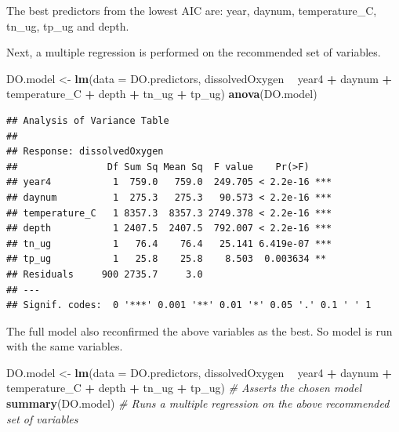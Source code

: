 \documentclass[12pt,]{article}
\newenvironment{Shaded}{\begin{snugshade}}{\end{snugshade}}
\newcommand{\CommentTok}[1]{\textcolor[rgb]{0.56,0.35,0.01}{\textit{#1}}}
\newcommand{\DataTypeTok}[1]{\textcolor[rgb]{0.13,0.29,0.53}{#1}}
\newcommand{\KeywordTok}[1]{\textcolor[rgb]{0.13,0.29,0.53}{\textbf{#1}}}
\newcommand{\NormalTok}[1]{#1}
\newcommand{\OperatorTok}[1]{\textcolor[rgb]{0.81,0.36,0.00}{\textbf{#1}}}
\newcommand{\StringTok}[1]{\textcolor[rgb]{0.31,0.60,0.02}{#1}}
\begin{document}
The best predictors from the lowest AIC are: year, daynum,
temperature\_C, tn\_ug, tp\_ug and depth.

Next, a multiple regression is performed on the recommended set of
variables.

\begin{Shaded}
\begin{Highlighting}[]
\NormalTok{DO.model <-}\StringTok{ }\KeywordTok{lm}\NormalTok{(}\DataTypeTok{data =}\NormalTok{ DO.predictors, dissolvedOxygen }\OperatorTok{~}\StringTok{ }\NormalTok{year4 }\OperatorTok{+}\StringTok{ }\NormalTok{daynum }\OperatorTok{+}\StringTok{ }\NormalTok{temperature_C }\OperatorTok{+}\StringTok{ }\NormalTok{depth }\OperatorTok{+}\StringTok{ }\NormalTok{tn_ug }\OperatorTok{+}\StringTok{ }\NormalTok{tp_ug) }
\KeywordTok{anova}\NormalTok{(DO.model)}
\end{Highlighting}
\end{Shaded}

\begin{verbatim}
## Analysis of Variance Table
## 
## Response: dissolvedOxygen
##                Df Sum Sq Mean Sq  F value    Pr(>F)    
## year4           1  759.0   759.0  249.705 < 2.2e-16 ***
## daynum          1  275.3   275.3   90.573 < 2.2e-16 ***
## temperature_C   1 8357.3  8357.3 2749.378 < 2.2e-16 ***
## depth           1 2407.5  2407.5  792.007 < 2.2e-16 ***
## tn_ug           1   76.4    76.4   25.141 6.419e-07 ***
## tp_ug           1   25.8    25.8    8.503  0.003634 ** 
## Residuals     900 2735.7     3.0                       
## ---
## Signif. codes:  0 '***' 0.001 '**' 0.01 '*' 0.05 '.' 0.1 ' ' 1
\end{verbatim}

The full model also reconfirmed the above variables as the best. So
model is run with the same variables.

\begin{Shaded}
\begin{Highlighting}[]
\NormalTok{DO.model <-}\StringTok{ }\KeywordTok{lm}\NormalTok{(}\DataTypeTok{data =}\NormalTok{ DO.predictors, dissolvedOxygen }\OperatorTok{~}\StringTok{ }\NormalTok{year4 }\OperatorTok{+}\StringTok{ }\NormalTok{daynum }\OperatorTok{+}\StringTok{ }\NormalTok{temperature_C }\OperatorTok{+}\StringTok{ }\NormalTok{depth }\OperatorTok{+}\StringTok{ }\NormalTok{tn_ug }\OperatorTok{+}\StringTok{ }\NormalTok{tp_ug) }\CommentTok{# Asserts the chosen model}
\KeywordTok{summary}\NormalTok{(DO.model) }\CommentTok{# Runs a multiple regression on the above recommended set of variables}
\end{Highlighting}
\end{Shaded}
\end{document}
